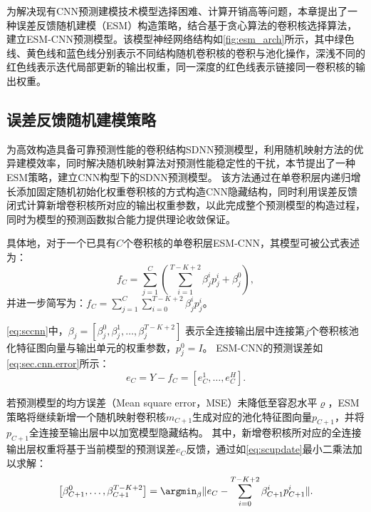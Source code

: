 为解决现有CNN预测建模技术模型选择困难、计算开销高等问题，本章提出了一种误差反馈随机建模（ESM）构造策略，结合基于贪心算法的卷积核选择算法，建立ESM-CNN预测模型。该模型神经网络结构如\autoref{fig:esm_arch}所示，其中绿色线、黄色线和蓝色线分别表示不同结构随机卷积核的卷积与池化操作，深浅不同的红色线表示迭代局部更新的输出权重，同一深度的红色线表示链接同一卷积核的输出权重。

\subsection{误差反馈随机建模策略\label{sec:esm.esm}}
为高效构造具备可靠预测性能的卷积结构SDNN预测模型，利用随机映射方法的优异建模效率，同时解决随机映射算法对预测性能稳定性的干扰，本节提出了一种ESM策略，建立CNN构型下的SDNN预测模型。
该方法通过在单卷积层内递归增长添加固定随机初始化权重卷积核的方式构造CNN隐藏结构，同时利用误差反馈闭式计算新增卷积核所对应的输出权重参数，以此完成整个预测模型的构造过程，同时为模型的预测函数拟合能力提供理论收敛保证。

具体地，对于一个已具有$C$个卷积核的单卷积层ESM-CNN，其模型可被公式表述为：
\begin{equation}
    \label{eq:sccnn}
    f_C = \sum^C_{j=1} \left( \sum^{T-K+2}_{i=1}\beta_{j}^i p_j^i + \beta^0_j \right),
\end{equation}
并进一步简写为：$f_C= \sum^C_{j=1}\sum^{T-K+2}_{i=0} \beta_j^i p_j^i$。



\autoref{eq:sccnn}中，$\beta_j = [\beta_j^0, \beta_j^1, \ldots, \beta_j^{T-K+2}]$ 表示全连接输出层中连接第$j$个卷积核池化特征图向量与输出单元的权重参数，$p_j^0 = I$。
ESM-CNN的预测误差如\autoref{eq:sec.cnn.error}所示：
\begin{equation}
    e_C = Y- f_C = [e_C^1,\ldots, e_C^H]. \label{eq:sec.cnn.error}
\end{equation}

若预测模型的均方误差（Mean square error，MSE）未降低至容忍水平$\varrho$，ESM策略将继续新增一个随机映射卷积核$m_{C+1}$生成对应的池化特征图向量$p_{C+1}$，并将$p_{C+1}$全连接至输出层中以加宽模型隐藏结构。
其中，新增卷积核所对应的全连接输出层权重将基于当前模型的预测误差$e_C$反馈，通过如\autoref{eq:scupdate}最小二乘法加以求解：
\begin{equation}\label{eq:scupdate}
    \left[\beta_{{C+1}}^0, \ldots, \beta_{{C+1}}^{T-K+2} \right]=\argmin _{\beta}\|e_C -\sum_{i=0}^{T-K+2} \beta_{C+1}^i p_{C+1}^i \|.
\end{equation}

